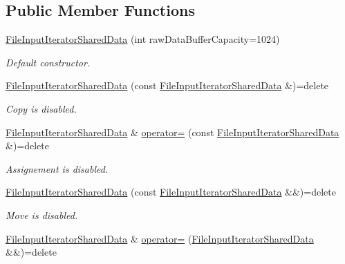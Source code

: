 \subsection*{Public Member Functions}
\begin{DoxyCompactItemize}
\item 
\hyperlink{class_mdt_1_1_plain_text_1_1_file_input_iterator_shared_data_a481b4eba3da74b1d7473b36e64ca372a}{File\+Input\+Iterator\+Shared\+Data} (int raw\+Data\+Buffer\+Capacity=1024)
\begin{DoxyCompactList}\small\item\em Default constructor. \end{DoxyCompactList}\item 
\hyperlink{class_mdt_1_1_plain_text_1_1_file_input_iterator_shared_data_a801c96b3ccddd767cfcdabca6e0f388f}{File\+Input\+Iterator\+Shared\+Data} (const \hyperlink{class_mdt_1_1_plain_text_1_1_file_input_iterator_shared_data}{File\+Input\+Iterator\+Shared\+Data} \&)=delete
\begin{DoxyCompactList}\small\item\em Copy is disabled. \end{DoxyCompactList}\item 
\hyperlink{class_mdt_1_1_plain_text_1_1_file_input_iterator_shared_data}{File\+Input\+Iterator\+Shared\+Data} \& \hyperlink{class_mdt_1_1_plain_text_1_1_file_input_iterator_shared_data_a1a49a2fb26a1165f1b785b9bab46f5e8}{operator=} (const \hyperlink{class_mdt_1_1_plain_text_1_1_file_input_iterator_shared_data}{File\+Input\+Iterator\+Shared\+Data} \&)=delete
\begin{DoxyCompactList}\small\item\em Assignement is disabled. \end{DoxyCompactList}\item 
\hyperlink{class_mdt_1_1_plain_text_1_1_file_input_iterator_shared_data_a1788932d201f21a9cc294ef8237c2d0f}{File\+Input\+Iterator\+Shared\+Data} (const \hyperlink{class_mdt_1_1_plain_text_1_1_file_input_iterator_shared_data}{File\+Input\+Iterator\+Shared\+Data} \&\&)=delete
\begin{DoxyCompactList}\small\item\em Move is disabled. \end{DoxyCompactList}\item 
\hyperlink{class_mdt_1_1_plain_text_1_1_file_input_iterator_shared_data}{File\+Input\+Iterator\+Shared\+Data} \& \hyperlink{class_mdt_1_1_plain_text_1_1_file_input_iterator_shared_data_a545a229a11409c6601525900cbf75889}{operator=} (\hyperlink{class_mdt_1_1_plain_text_1_1_file_input_iterator_shared_data}{File\+Input\+Iterator\+Shared\+Data} \&\&)=delete

\end{DoxyCompactItemize}
